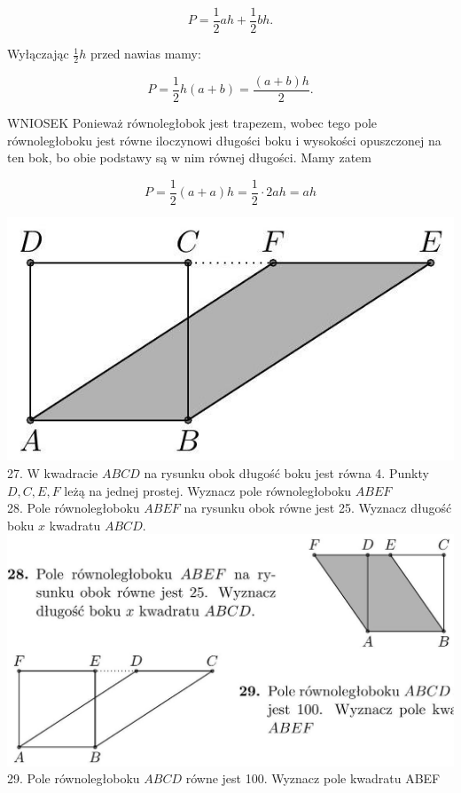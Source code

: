 \documentclass[10pt]{article}
\begin{document}
\[
P=\frac{1}{2} a h+\frac{1}{2} b h .
\]

Wyłączając \(\frac{1}{2} h\) przed nawias mamy:

\[
P=\frac{1}{2} h(a+b)=\frac{(a+b) h}{2} .
\]

WNIOSEK Ponieważ równoległobok jest trapezem, wobec tego pole równoległoboku jest równe iloczynowi długości boku i wysokości opuszczonej na ten bok, bo obie podstawy są w nim równej długości. Mamy zatem

\[
P=\frac{1}{2}(a+a) h=\frac{1}{2} \cdot 2 a h=a h
\]

\includegraphics[max width=\textwidth, center]{2024_11_21_71f62bd117d375398909g-037}\\
27. W kwadracie \(A B C D\) na rysunku obok długość boku jest równa 4. Punkty \(D, C, E, F\) leżą na jednej prostej. Wyznacz pole równoległoboku \(A B E F\)\\
28. Pole równoległoboku \(A B E F\) na rysunku obok równe jest 25. Wyznacz długość boku \(x\) kwadratu \(A B C D\).\\
\includegraphics[max width=\textwidth, center]{2024_11_21_71f62bd117d375398909g-037(1)}\\
29. Pole równoległoboku \(A B C D\) równe jest 100. Wyznacz pole kwadratu ABEF\\
\end{document}
